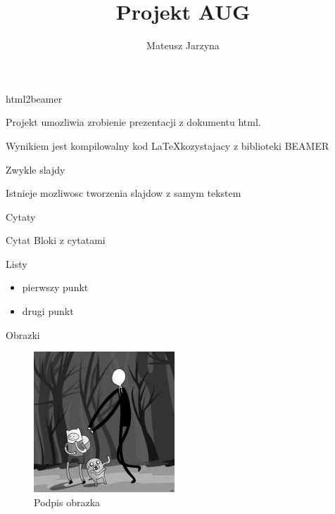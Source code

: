\documentclass{beamer}
\begin{document}
\title{Projekt AUG}

\author{Mateusz Jarzyna}



\begin{frame}
\titlepage
\end{frame}


\begin{frame}{html2beamer}

Projekt umozliwia zrobienie prezentacji z dokumentu html. 

Wynikiem jest kompilowalny kod \LaTeX kozystajacy z biblioteki BEAMER

\end{frame}



\begin{frame}{Zwykle slajdy}

Istnieje mozliwosc tworzenia slajdow z samym tekstem

\end{frame}



\begin{frame}{Cytaty}

\begin{block}{Cytat}
Bloki z cytatami\end{block}

\end{frame}



\begin{frame}{Listy}

\begin{itemize}

\item pierwszy punkt

\item drugi punkt

\end{itemize}

\end{frame}



\begin{frame}{Obrazki}

\begin{figure}[p]
\centering
\includegraphics{img.jpg}
\caption{Podpis obrazka}
\end{figure}

\end{frame}
\end{document}
